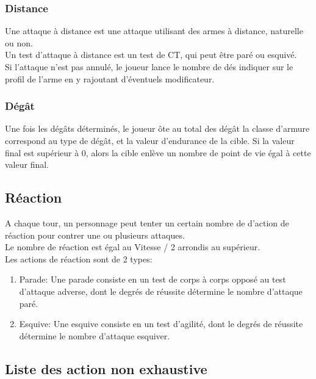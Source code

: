 \subsubsection*{Distance}
Une attaque à distance est une attaque utilisant des armes à distance, naturelle ou non. \\
Un test d'attaque à distance est un test de CT, qui peut être paré ou esquivé. \\
Si l'attaque n'est pas annulé, le joueur lance le nombre de dés indiquer sur le profil de l'arme en y rajoutant d'éventuels modificateur.

\subsubsection*{Dégât}
Une fois les dégâts déterminés, le joueur ôte au total des dégât la classe d'armure correspond au type de dégât, et la valeur d'endurance de la cible. Si la valeur final est supérieur à 0, alors la cible enlève un nombre de point de vie égal à cette valeur final.

\hypertarget{reac}{\subsection{Réaction}}
A chaque tour, un personnage peut tenter un certain nombre de d'action de réaction pour contrer une ou plusieurs attaques. \\
Le nombre de réaction est égal au Vitesse / 2 arrondis au supérieur. \\
Les actions de réaction sont de 2 types:
\begin{enumerate}
\item Parade: Une parade consiste en un test de corps à corps opposé au test d'attaque adverse, dont le degrés de réussite détermine le nombre d'attaque paré.
\item Esquive: Une esquive consiste en un test d'agilité, dont le degrés de réussite détermine le nombre d'attaque esquiver.
\end{enumerate}


\subsection{Liste des action non exhaustive}


